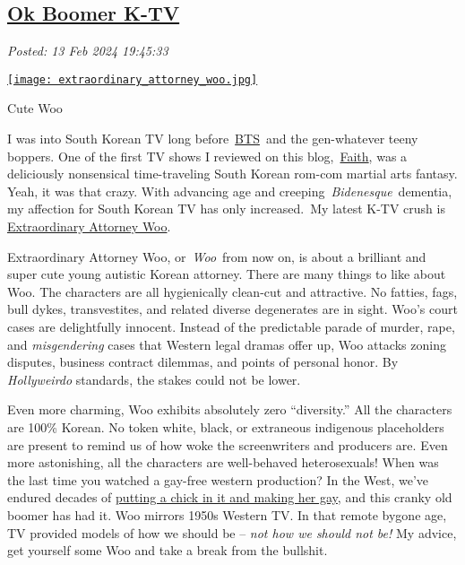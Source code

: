 %

\subsection*{\href{http://analyzethedatanotthedrivel.org/2024/02/13/ok-boomer-k-tv/}{Ok Boomer K-TV}}


\noindent\emph{Posted: 13 Feb 2024 19:45:33}
\vspace{6pt}

\captionsetup[floatingfigure]{labelformat=empty}
\begin{floatingfigure}[l]{0.24\textwidth}
\centering
\href{https://www.imdb.com/title/tt20869502/}{\texttt{[image: extraordinary\_attorney\_woo.jpg]}}
\label{fig:8005x0}
\caption[Extraordinary Attorney Woo]{Cute Woo}
\end{floatingfigure}I was into South Korean TV long
before~\href{https://kprofiles.com/bts-bangtan-boys-members-profile/}{BTS}~and
the gen-whatever teeny boppers. One of the first TV shows I reviewed on
this
blog,~\href{https://analyzethedatanotthedrivel.org/2012/09/02/faith-a-guilty-pleasure/}{Faith},
was a deliciously nonsensical time-traveling South Korean rom-com
martial arts fantasy. Yeah, it was that crazy. With advancing age and
creeping~\emph{Bidenesque}~dementia, my affection for South Korean TV
has only increased.~My latest K-TV crush is
\href{https://www.imdb.com/title/tt20869502/}{Extraordinary Attorney
Woo}.


Extraordinary Attorney Woo, or~\emph{Woo}~from now on, is about a
brilliant and super cute young autistic Korean attorney. There are many
things to like about Woo. The characters are all hygienically clean-cut
and attractive. No fatties, fags, bull dykes, transvestites, and related
diverse degenerates are in sight. Woo's court cases are delightfully
innocent. Instead of the predictable parade of murder, rape, and
\emph{misgendering} cases that Western legal dramas offer up, Woo
attacks zoning disputes, business contract dilemmas, and points of
personal honor. By \emph{Hollyweirdo} standards, the stakes could not be
lower.

Even more charming, Woo exhibits absolutely zero ``diversity.'' All the
characters are 100\% Korean. No token white, black, or extraneous
indigenous placeholders are present to remind us of how woke the
screenwriters and producers are. Even more astonishing, all the
characters are well-behaved heterosexuals! When was the last time you
watched a gay-free western production? In the West, we've endured
decades of \href{https://www.youtube.com/watch?v=9vJDcCcANnU}{putting a
chick in it and making her gay}, and this cranky old boomer has had it.
Woo mirrors 1950s Western TV. In that remote bygone age, TV provided
models of how we should be -- \emph{not how we should not be!} My
advice, get yourself some Woo and take a break from the bullshit.


%

